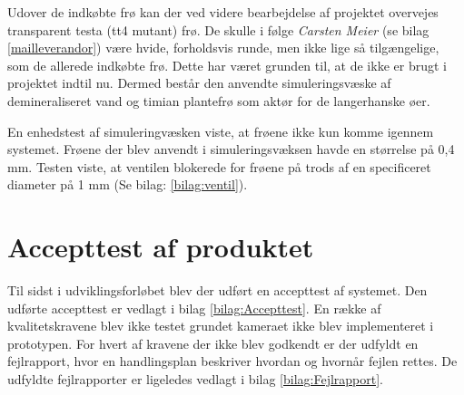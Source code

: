 Udover de indkøbte frø kan der ved videre bearbejdelse af projektet overvejes transparent testa (tt4 mutant) frø. De skulle i følge \textit{Carsten Meier} (se bilag \ref{mailleverandor}) være hvide, forholdsvis runde, men ikke lige så tilgængelige, som de allerede indkøbte frø. Dette har været grunden til, at de ikke er brugt i projektet indtil nu. Dermed består den anvendte simuleringsvæske af demineraliseret vand og timian plantefrø som aktør for de langerhanske øer.  

En enhedstest af simuleringvæsken viste, at frøene ikke kun komme igennem systemet. Frøene der blev anvendt i simuleringsvæksen havde en størrelse på 0,4 mm. Testen viste, at ventilen blokerede for frøene på trods af en specificeret diameter på 1 mm (Se bilag: \ref{bilag:ventil}). 
 
\section{Accepttest af produktet} 
Til sidst i udviklingsforløbet blev der udført en accepttest af systemet. Den udførte accepttest er vedlagt i bilag \ref{bilag:Accepttest}. En række af kvalitetskravene blev ikke testet grundet kameraet ikke blev implementeret i prototypen. For hvert af kravene der ikke blev godkendt er der udfyldt en fejlrapport, hvor en handlingsplan beskriver hvordan og hvornår fejlen rettes. De udfyldte fejlrapporter er ligeledes vedlagt i bilag \ref{bilag:Fejlrapport}.

